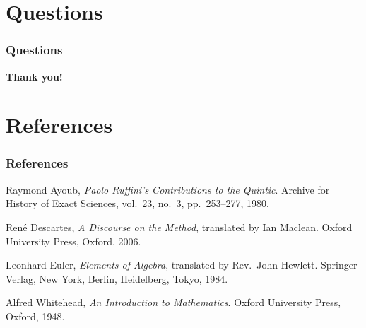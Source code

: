 \documentclass[draft,notes=show,xcolor=dvipsnames]{beamer}
\begin{document}
\section*{Questions}

\begin{frame}[c]
  \frametitle{Questions}
  \Large\bfseries\centering Thank you!
\end{frame}

\section*{References}

\begin{frame}
  \frametitle{References}
  \begin{thebibliography}{Whitehead}
      Raymond Ayoub,
      \emph{Paolo Ruffini's Contributions to the Quintic}.
      Archive for History of Exact Sciences,
      vol.~23, no.~3, pp.~253--277, 1980.
    
      Ren{\'e} Descartes,
      \emph{{A Discourse on the Method}},
      translated by Ian Maclean.
      Oxford University Press, Oxford, 2006.

      Leonhard Euler,
      \emph{{Elements of Algebra}},
      translated by Rev.~John Hewlett.
      Springer-Verlag, New York, Berlin, Heidelberg, Tokyo, 1984.

      Alfred Whitehead,
      \emph{{An Introduction to Mathematics}}.
      Oxford University Press, Oxford, 1948.
  \end{thebibliography}
\end{frame}
\end{document}
